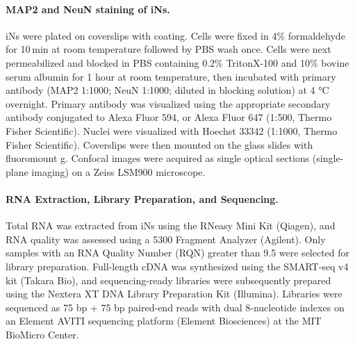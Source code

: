 \paragraph{MAP2 and NeuN staining of iNs.}
iNs were plated on coverslips with coating. Cells were fixed in 4\% formaldehyde for 10 min at room temperature followed by PBS wash once. Cells were next permeabilized and blocked in PBS containing 0.2\% TritonX-100 and 10\% bovine serum albumin for 1 hour at room temperature, then incubated with primary antibody (MAP2 1:1000; NeuN 1:1000; diluted in blocking solution) at 4 °C overnight. Primary antibody was visualized using the appropriate secondary antibody conjugated to Alexa Fluor 594, or Alexa Fluor 647 (1:500, Thermo Fisher Scientific). Nuclei were visualized with Hoechst 33342 (1:1000, Thermo Fisher Scientific). Coverslips were then mounted on the glass slides with fluoromount g. Confocal images were acquired as single optical sections (single-plane imaging) on a Zeiss LSM900 microscope.

\paragraph{RNA Extraction, Library Preparation, and Sequencing.}
Total RNA was extracted from iNs using the RNeasy Mini Kit (Qiagen), and RNA quality was assessed using a 5300 Fragment Analyzer (Agilent). Only samples with an RNA Quality Number (RQN) greater than 9.5 were selected for library preparation. Full-length cDNA was synthesized using the SMART-seq v4 kit (Takara Bio), and sequencing-ready libraries were subsequently prepared using the Nextera XT DNA Library Preparation Kit (Illumina). Libraries were sequenced as 75 bp + 75 bp paired-end reads with dual 8-nucleotide indexes on an Element AVITI sequencing platform (Element Biosciences) at the MIT BioMicro Center. 